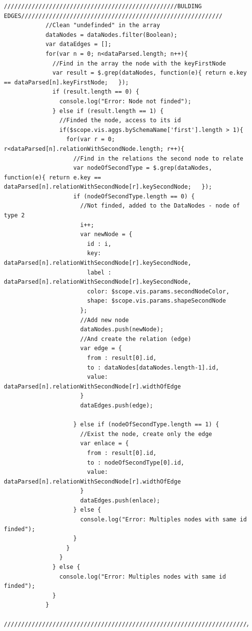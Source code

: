 \documentclass[a4paper, 12pt]{book}
\begin{document}
\begin{lstlisting}[frame=single]
            //////////////////////////////////////////////////BULDING EDGES//////////////////////////////////////////////////////////
            //Clean "undefinded" in the array
            dataNodes = dataNodes.filter(Boolean);
            var dataEdges = [];
            for(var n = 0; n<dataParsed.length; n++){
              //Find in the array the node with the keyFirstNode
              var result = $.grep(dataNodes, function(e){ return e.key == dataParsed[n].keyFirstNode;   });
              if (result.length == 0) {
                console.log("Error: Node not finded");
              } else if (result.length == 1) {
                //Finded the node, access to its id
                if($scope.vis.aggs.bySchemaName['first'].length > 1){
                  for(var r = 0; r<dataParsed[n].relationWithSecondNode.length; r++){
                    //Find in the relations the second node to relate
                    var nodeOfSecondType = $.grep(dataNodes, function(e){ return e.key == dataParsed[n].relationWithSecondNode[r].keySecondNode;   });
                    if (nodeOfSecondType.length == 0) {
                      //Not finded, added to the DataNodes - node of type 2
                      i++;
                      var newNode = {
                        id : i,
                        key: dataParsed[n].relationWithSecondNode[r].keySecondNode,
                        label : dataParsed[n].relationWithSecondNode[r].keySecondNode,
                        color: $scope.vis.params.secondNodeColor,
                        shape: $scope.vis.params.shapeSecondNode
                      };
                      //Add new node
                      dataNodes.push(newNode);
                      //And create the relation (edge)
                      var edge = {
                        from : result[0].id,
                        to : dataNodes[dataNodes.length-1].id,
                        value: dataParsed[n].relationWithSecondNode[r].widthOfEdge
                      }
                      dataEdges.push(edge);

                    } else if (nodeOfSecondType.length == 1) {
                      //Exist the node, create only the edge
                      var enlace = {
                        from : result[0].id,
                        to : nodeOfSecondType[0].id,
                        value: dataParsed[n].relationWithSecondNode[r].widthOfEdge
                      }
                      dataEdges.push(enlace);
                    } else {
                      console.log("Error: Multiples nodes with same id finded");
                    }
                  }
                }
              } else {
                console.log("Error: Multiples nodes with same id finded");
              }
            }
            ////////////////////////////////////////////////////////////////////////////////////////////////////////////



\end{lstlisting}
\end{document}
